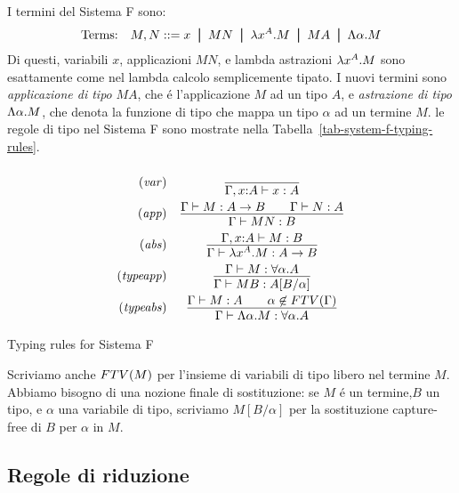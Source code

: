 \documentclass{article}
\begin{document}
I termini del Sistema F sono:
\[ \mbox{Terms:}\ssep M,N \bnf x \bor MN \bor \lamabs{x}{A}.M \bor MA
\bor \Lamabs{\alpha}.M
\]
Di questi, variabili $x$, applicazioni $MN$, e lambda astrazioni
$\lambda x^{A}.M$ sono esattamente come nel lambda
calcolo semplicemente tipato. I nuovi termini sono {\em applicazione di tipo} $MA$, che \'e
l'applicazione $M$ ad un tipo $A$, e {\em astrazione di tipo}
 $\Lambda\alpha.M$, che denota la funzione di tipo
che mappa un tipo $\alpha$ ad un  termine $M$. le regole di tipo nel Sistema F
sono mostrate nella Tabella~\ref{tab-system-f-typing-rules}.
\begin{table*}[tbp]
\[
\begin{array}{rc}
        \tjvar
&       \deriv{}{\Gamma,\typ{x}{ A}\tj x: A}
\nl     \tjapp
&       \deriv{\Gamma\tj M: A\to B\sep\Gamma\tj N: A}
                {\Gamma\tj MN: B}
\nl     \tjlam
&       \deriv{\Gamma,\typ{x}{ A}\tj M: B}
                {\Gamma\tj\lamabs{x}{A}.M: A\to B}
\nl     \tjApp
&       \deriv{\Gamma\tj M: \forall\alpha.A}
                {\Gamma\tj MB: A[B/\alpha]}
\nl     \tjLam
&       \deriv{\Gamma \tj M: A\sep \alpha\not\in\FTV{\Gamma}}
                {\Gamma\tj\Lamabs{\alpha}.M: \forall\alpha.A}
\end{array}
\]
\caption{Typing rules for Sistema F}
\label{tab-system-f-typing-rules}
\end{table*}

Scriviamo anche $FTV(M)$ per l'insieme di variabili di tipo libero nel termine
$M$. Abbiamo bisogno di una nozione finale di sostituzione: se  $M$ \'e un termine,$B$ un tipo,
e $\alpha$ una variabile di tipo, scriviamo $M[B/\alpha]$ per la
sostituzione capture-free di $B$ per $\alpha$ in $M$. 

\subsection{Regole di riduzione}
\end{document}
